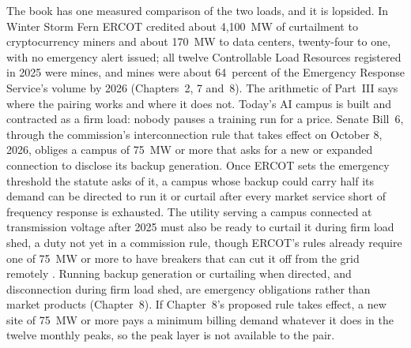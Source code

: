 The book has one measured comparison of the two loads, and it is lopsided. In Winter Storm Fern ERCOT credited about 4,100~MW of curtailment to cryptocurrency miners and about 170~MW to data centers, twenty-four to one, with no emergency alert issued; all twelve Controllable Load Resources registered in 2025 were mines, and mines were about 64~percent of the Emergency Response Service's volume by 2026 (Chapters~2, 7 and~8). %
The arithmetic of Part~III says where the pairing works and where it does not. Today's AI campus is built and contracted as a firm load: nobody pauses a training run for a price. Senate Bill~6, through the commission's interconnection rule that takes effect on October 8, 2026, obliges a campus of 75~MW or more that asks for a new or expanded connection to disclose its backup generation. Once ERCOT sets the emergency threshold the statute asks of it, a campus whose backup could carry half its demand can be directed to run it or curtail after every market service short of frequency response is exhausted. The utility serving a campus connected at transmission voltage after 2025 must also be ready to curtail it during firm load shed, a duty not yet in a commission rule, though ERCOT's rules already require one of 75~MW or more to have breakers that can cut it off from the grid remotely \autocite{texas2025sb6,puct2026order58481,ercot2026sb6status,ercotplanningguide2026,puct2026sb6roadmap}. Running backup generation or curtailing when directed, and disconnection during firm load shed, are emergency obligations rather than market products (Chapter~8). If Chapter~8's proposed rule takes effect, a new site of 75~MW or more pays a minimum billing demand whatever it does in the twelve monthly peaks, so the peak layer is not available to the pair. %